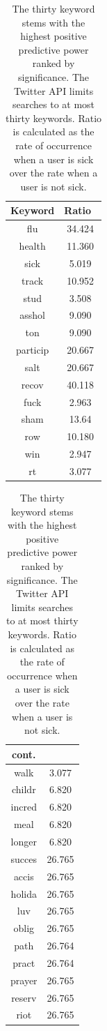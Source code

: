 \documentclass{sig-alternate-2013}
\begin{document}
\begin{table}[!ht]
\centering
\begin{tabular}{|c|c|}\hline
Keyword&Ratio\ \\ \hline
flu &  34.424\\ \hline
health &  11.360\\ \hline
sick &  5.019\\ \hline
track & 10.952 \\ \hline
stud & 3.508 \\ \hline
asshol & 9.090 \\ \hline
ton & 9.090 \\ \hline
particip & 20.667 \\ \hline
salt & 20.667 \\ \hline
recov & 40.118 \\ \hline
fuck & 2.963 \\ \hline
sham & 13.64 \\ \hline
row & 10.180 \\ \hline
win & 2.947 \\ \hline
rt & 3.077 \\ \hline
  \end{tabular}
  \hspace{1em}
\begin{tabular}{|c|c|}\hline
cont. & \\ \hline
walk & 3.077 \\ \hline
childr & 6.820 \\ \hline
incred & 6.820 \\ \hline
meal & 6.820 \\ \hline
longer &  6.820 \\ \hline
succes &  26.765 \\ \hline
accis & 26.765 \\ \hline
holida & 26.765 \\ \hline
luv & 26.765 \\ \hline
oblig & 26.765 \\ \hline
path & 26.764 \\ \hline
pract & 26.764 \\ \hline
prayer & 26.765 \\ \hline
reserv & 26.765 \\ \hline
riot & 26.765 \\ 
\hline\end{tabular}
\caption{The thirty keyword stems with the highest positive predictive power ranked by significance. The Twitter API limits searches to at most thirty keywords. Ratio is calculated as the rate of occurrence when a user is sick over the rate when a user is not sick.}
\label{tab:thirty_best}
\end{table}
\end{document}

